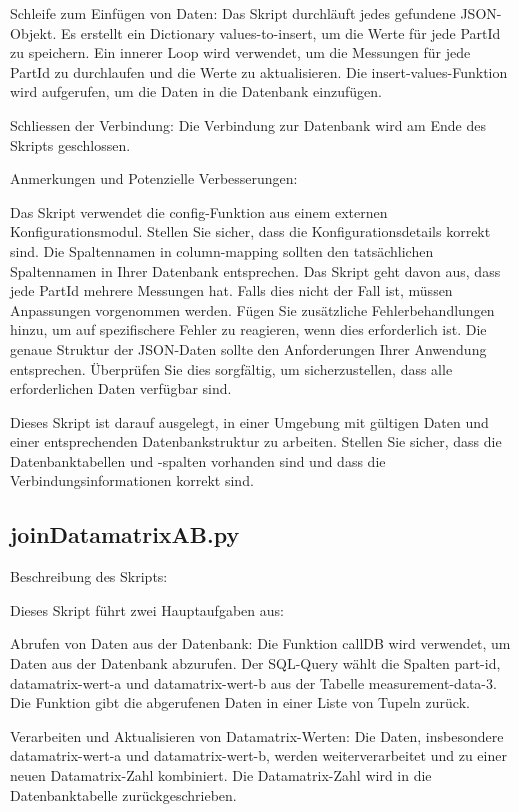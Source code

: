     Schleife zum Einfügen von Daten:
        Das Skript durchläuft jedes gefundene JSON-Objekt.
        Es erstellt ein Dictionary values-to-insert, um die Werte für jede PartId zu speichern.
        Ein innerer Loop wird verwendet, um die Messungen für jede PartId zu durchlaufen und die Werte zu aktualisieren.
        Die insert-values-Funktion wird aufgerufen, um die Daten in die Datenbank einzufügen.

    Schliessen der Verbindung:
        Die Verbindung zur Datenbank wird am Ende des Skripts geschlossen.

Anmerkungen und Potenzielle Verbesserungen:

    Das Skript verwendet die config-Funktion aus einem externen Konfigurationsmodul. Stellen Sie sicher, dass die Konfigurationsdetails korrekt sind.
    Die Spaltennamen in column-mapping sollten den tatsächlichen Spaltennamen in Ihrer Datenbank entsprechen.
    Das Skript geht davon aus, dass jede PartId mehrere Messungen hat. Falls dies nicht der Fall ist, müssen Anpassungen vorgenommen werden.
    Fügen Sie zusätzliche Fehlerbehandlungen hinzu, um auf spezifischere Fehler zu reagieren, wenn dies erforderlich ist.
    Die genaue Struktur der JSON-Daten sollte den Anforderungen Ihrer Anwendung entsprechen. Überprüfen Sie dies sorgfältig, um sicherzustellen, dass alle erforderlichen Daten verfügbar sind.

    Dieses Skript ist darauf ausgelegt, in einer Umgebung mit gültigen Daten und einer entsprechenden Datenbankstruktur zu arbeiten. Stellen Sie sicher, dass die Datenbanktabellen und -spalten vorhanden sind und dass die Verbindungsinformationen korrekt sind.


    \subsection{joinDatamatrixAB.py}

    Beschreibung des Skripts:

Dieses Skript führt zwei Hauptaufgaben aus:

    Abrufen von Daten aus der Datenbank:
        Die Funktion callDB wird verwendet, um Daten aus der Datenbank abzurufen. Der SQL-Query wählt die Spalten part-id, datamatrix-wert-a und datamatrix-wert-b aus der Tabelle measurement-data-3. Die Funktion gibt die abgerufenen Daten in einer Liste von Tupeln zurück.

    Verarbeiten und Aktualisieren von Datamatrix-Werten:
        Die Daten, insbesondere datamatrix-wert-a und datamatrix-wert-b, werden weiterverarbeitet und zu einer neuen Datamatrix-Zahl kombiniert.
        Die Datamatrix-Zahl wird in die Datenbanktabelle zurückgeschrieben.

